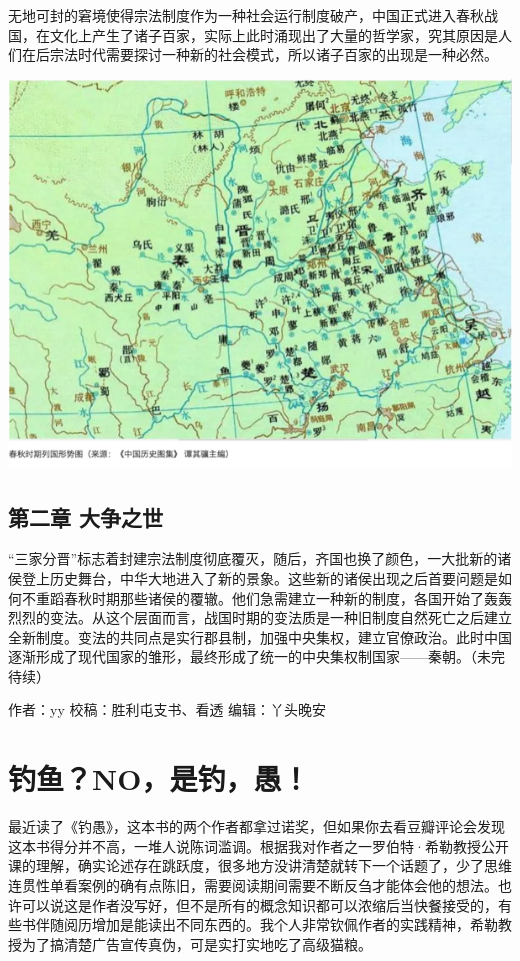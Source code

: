 \documentclass[
]{book}
\begin{document}
无地可封的窘境使得宗法制度作为一种社会运行制度破产，中国正式进入春秋战国，在文化上产生了诸子百家，实际上此时涌现出了大量的哲学家，究其原因是人们在后宗法时代需要探讨一种新的社会模式，所以诸子百家的出现是一种必然。

\includegraphics[width=8.33in]{images/gx4}

\hypertarget{ux7b2cux4e8cux7ae0-ux5927ux4e89ux4e4bux4e16}{%
\subsection{第二章 大争之世}\label{ux7b2cux4e8cux7ae0-ux5927ux4e89ux4e4bux4e16}}

``三家分晋''标志着封建宗法制度彻底覆灭，随后，齐国也换了颜色，一大批新的诸侯登上历史舞台，中华大地进入了新的景象。这些新的诸侯出现之后首要问题是如何不重蹈春秋时期那些诸侯的覆辙。他们急需建立一种新的制度，各国开始了轰轰烈烈的变法。从这个层面而言，战国时期的变法质是一种旧制度自然死亡之后建立全新制度。变法的共同点是实行郡县制，加强中央集权，建立官僚政治。此时中国逐渐形成了现代国家的雏形，最终形成了统一的中央集权制国家------秦朝。（未完待续）

作者：yy
校稿：胜利屯支书、看透
编辑：丫头晚安

\hypertarget{ux9493ux9c7cnoux662fux9493ux611a}{%
\section{钓鱼？NO，是钓，愚！}\label{ux9493ux9c7cnoux662fux9493ux611a}}

最近读了《钓愚》，这本书的两个作者都拿过诺奖，但如果你去看豆瓣评论会发现这本书得分并不高，一堆人说陈词滥调。根据我对作者之一罗伯特·希勒教授公开课的理解，确实论述存在跳跃度，很多地方没讲清楚就转下一个话题了，少了思维连贯性单看案例的确有点陈旧，需要阅读期间需要不断反刍才能体会他的想法。也许可以说这是作者没写好，但不是所有的概念知识都可以浓缩后当快餐接受的，有些书伴随阅历增加是能读出不同东西的。我个人非常钦佩作者的实践精神，希勒教授为了搞清楚广告宣传真伪，可是实打实地吃了高级猫粮。
\end{document}

